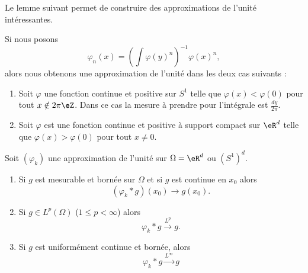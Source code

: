 Le lemme suivant permet de construire des approximations de l'unité intéressantes.
\begin{lemma}   \label{LemCNjIYhv}
    Si nous posons
    \begin{equation}
        \varphi_n(x)=\left( \int\varphi(y)^n \right)^{-1}\varphi(x)^n,
    \end{equation}
    alors nous obtenons une approximation de l'unité dans les deux cas suivants :
    \begin{enumerate}
        \item
            Soit \( \varphi\) une fonction continue et positive sur \( S^1\) telle que \( \varphi(x)<\varphi(0)\) pour tout \( x\notin 2\pi \eZ\). Dans ce cas la mesure à prendre pour l'intégrale est \( \frac{ dy }{ 2\pi }\).
        \item
            Soit \( \varphi\) est une fonction continue et positive à support compact sur \( \eR^d\) telle que \( \varphi(x)>\varphi(0)\) pour tout \( x\neq 0\).
            
    \end{enumerate}
\end{lemma}

\begin{theorem} \label{ThoYQbqEez}
    Soit \( (\varphi_k)\) une approximation de l'unité sur \( \Omega=\eR^d\) ou \( (S^1)^d\).
    \begin{enumerate}
        \item
            Si \( g\) est mesurable et bornée sur \( \Omega\) et si \( g\) est continue en \( x_0\) alors 
            \begin{equation}
                (\varphi_k*g)(x_0)\to g(x_0).
            \end{equation}
        \item
            Si \( g\in L^p(\Omega)\) (\( 1\leq p<\infty\)) alors
            \begin{equation}
                \varphi_k*g\stackrel{L^p}{\to}g.
            \end{equation}
        \item
            Si \( g\) est uniformément continue et bornée, alors
            \begin{equation}
                \varphi_k*g\stackrel{L^{\infty}}{\to}g
            \end{equation}
    \end{enumerate}
\end{theorem}

